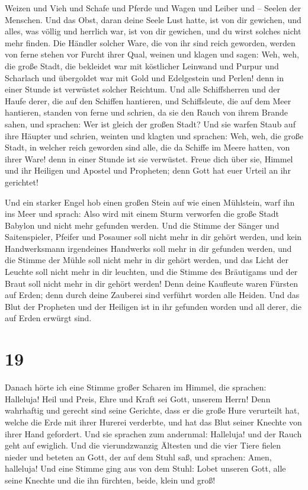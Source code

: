 Weizen und Vieh und Schafe und Pferde und Wagen und Leiber und -- Seelen
der Menschen.  Und das Obst, daran deine Seele Lust
hatte, ist von dir gewichen, und alles, was völlig und herrlich war, ist
von dir gewichen, und du wirst solches nicht mehr finden.
 Die Händler solcher Ware, die von ihr sind reich
geworden, werden von ferne stehen vor Furcht ihrer Qual, weinen und
klagen  und sagen: Weh, weh, die große Stadt, die
bekleidet war mit köstlicher Leinwand und Purpur und Scharlach und
übergoldet war mit Gold und Edelgestein und Perlen!  denn
in einer Stunde ist verwüstet solcher Reichtum. Und alle Schiffsherren
und der Haufe derer, die auf den Schiffen hantieren, und Schiffsleute,
die auf dem Meer hantieren, standen von ferne  und
schrien, da sie den Rauch von ihrem Brande sahen, und sprachen: Wer ist
gleich der großen Stadt?  Und sie warfen Staub auf ihre
Häupter und schrien, weinten und klagten und sprachen: Weh, weh, die
große Stadt, in welcher reich geworden sind alle, die da Schiffe im
Meere hatten, von ihrer Ware! denn in einer Stunde ist sie verwüstet.
 Freue dich über sie, Himmel und ihr Heiligen und Apostel
und Propheten; denn Gott hat euer Urteil an ihr gerichtet!

 Und ein starker Engel hob einen großen Stein auf wie
einen Mühlstein, warf ihn ins Meer und sprach: Also wird mit einem Sturm
verworfen die große Stadt Babylon und nicht mehr gefunden werden.
 Und die Stimme der Sänger und Saitenspieler, Pfeifer und
Posauner soll nicht mehr in dir gehört werden, und kein Handwerksmann
irgendeines Handwerks soll mehr in dir gefunden werden, und die Stimme
der Mühle soll nicht mehr in dir gehört werden,  und das
Licht der Leuchte soll nicht mehr in dir leuchten, und die Stimme des
Bräutigams und der Braut soll nicht mehr in dir gehört werden! Denn
deine Kaufleute waren Fürsten auf Erden; denn durch deine Zauberei sind
verführt worden alle Heiden.  Und das Blut der Propheten
und der Heiligen ist in ihr gefunden worden und all derer, die auf Erden
erwürgt sind.

\hypertarget{section-18}{%
\section{19}\label{section-18}}

 Danach hörte ich eine Stimme großer Scharen im Himmel,
die sprachen: Halleluja! Heil und Preis, Ehre und Kraft sei Gott,
unserem Herrn!  Denn wahrhaftig und gerecht sind seine
Gerichte, dass er die große Hure verurteilt hat, welche die Erde mit
ihrer Hurerei verderbte, und hat das Blut seiner Knechte von ihrer Hand
gefordert.  Und sie sprachen zum andernmal: Halleluja! und
der Rauch geht auf ewiglich.  Und die vierundzwanzig
Ältesten und die vier Tiere fielen nieder und beteten an Gott, der auf
dem Stuhl saß, und sprachen: Amen, halleluja!  Und eine
Stimme ging aus von dem Stuhl: Lobet unseren Gott, alle seine Knechte
und die ihn fürchten, beide, klein und groß!

